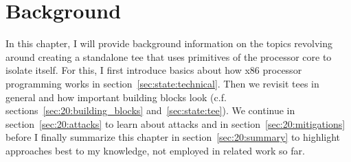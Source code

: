 \chapter{Background}
\label{sec:state}






In this chapter, I will provide background information on the topics revolving
around creating a standalone \gls{tee} that uses primitives of the processor
core to isolate itself. For this, I first introduce basics about how x86
processor programming works in section~\ref{sec:state:technical}. Then we
revisit \glspl{tee} in general and how important building blocks look (c.f.
sections~\ref{sec:20:building_blocks} and~\ref{sec:state:tee}). We continue in
section~\ref{sec:20:attacks} to learn about attacks and in
section~\ref{sec:20:mitigations} before I finally summarize this chapter in
section~\ref{sec:20:summary} to highlight approaches best to my knowledge, not
employed in related work so far.






\cleardoublepage

